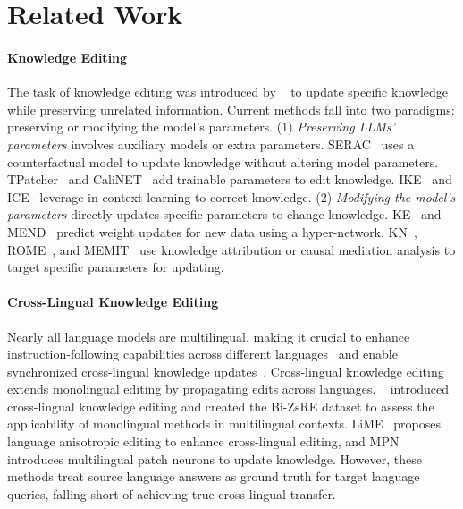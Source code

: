 \section{Related Work}

\paragraph{Knowledge Editing}  
The task of knowledge editing was introduced by ~\cite{sinitsin2020editable} to update specific knowledge while preserving unrelated information. Current methods fall into two paradigms: preserving or modifying the model’s parameters.
(1) \emph{Preserving LLMs' parameters} involves auxiliary models or extra parameters. SERAC~\cite{mitchell2022memory} uses a counterfactual model to update knowledge without altering model parameters. TPatcher~\cite{huang2023transformer} and CaliNET~\cite{dong2022calibrating} add trainable parameters to edit knowledge. IKE~\cite{zheng2023can} and ICE~\cite{cohen2024evaluating} leverage in-context learning to correct knowledge.
(2) \emph{Modifying the model's parameters} directly updates specific parameters to change knowledge. KE~\cite{de2021editing} and MEND~\cite{mitchell2021fast} predict weight updates for new data using a hyper-network. KN~\cite{dai2021knowledge}, ROME~\cite{meng2022rome}, and MEMIT~\cite{meng2022mass} use knowledge attribution or causal mediation analysis to target specific parameters for updating.

\paragraph{Cross-Lingual Knowledge Editing}  
Nearly all language models are multilingual, making it crucial to enhance instruction-following capabilities across different languages~\cite{zan2024building} and enable synchronized cross-lingual knowledge updates~\cite{xu2022language,wang2023cross}. 
Cross-lingual knowledge editing extends monolingual editing by propagating edits across languages. ~\citet{wang2023cross} introduced cross-lingual knowledge editing and created the Bi-ZsRE dataset to assess the applicability of monolingual methods in multilingual contexts. LiME~\cite{xu2022language} proposes language anisotropic editing to enhance cross-lingual editing, and MPN~\cite{si2024mpn} introduces multilingual patch neurons to update knowledge. However, these methods treat source language answers as ground truth for target language queries, falling short of achieving true cross-lingual transfer.

